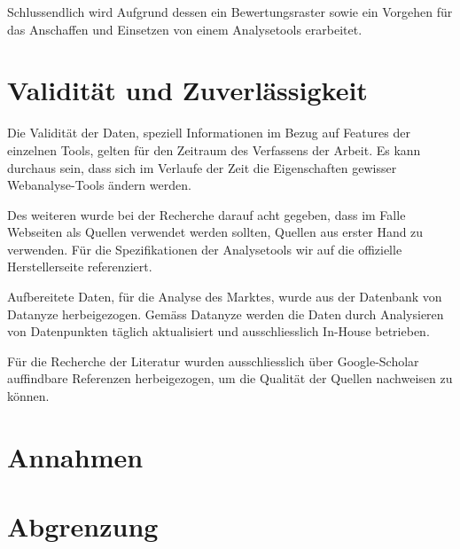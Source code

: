 Schlussendlich wird Aufgrund dessen ein Bewertungsraster sowie ein Vorgehen für das Anschaffen und Einsetzen von einem Analysetools erarbeitet. 

\section{Validität und Zuverlässigkeit}
Die Validität der Daten, speziell Informationen im Bezug auf Features der einzelnen Tools, gelten für den Zeitraum des Verfassens der Arbeit. Es kann durchaus sein, dass sich im Verlaufe der Zeit die Eigenschaften gewisser Webanalyse-Tools ändern werden. 

Des weiteren wurde bei der Recherche darauf acht gegeben, dass im Falle Webseiten als Quellen verwendet werden sollten, Quellen aus erster Hand zu verwenden. Für die Spezifikationen der Analysetools wir auf die offizielle Herstellerseite referenziert.

Aufbereitete Daten, für die Analyse des Marktes, wurde aus der Datenbank von Datanyze \parencite{datanyzeSwitzerlandWebanalytics} herbeigezogen. Gemäss Datanyze \parencite{datanyzeFAQ} werden die Daten durch Analysieren von Datenpunkten täglich aktualisiert und ausschliesslich In-House betrieben.

Für die Recherche der Literatur wurden ausschliesslich über Google-Scholar auffindbare Referenzen herbeigezogen, um die Qualität der Quellen nachweisen zu können.

\section{Annahmen}

\section{Abgrenzung}
